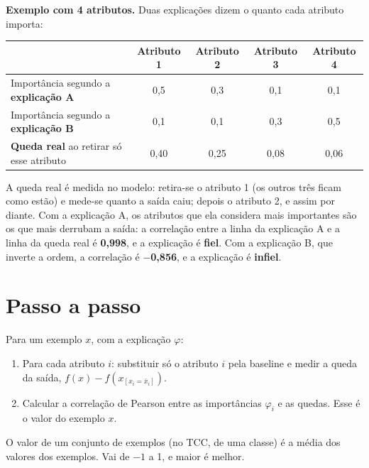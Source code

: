 \documentclass[11pt,a4paper]{article}
\begin{document}
\textbf{Exemplo com 4 atributos.} Duas explicações dizem o quanto cada atributo importa:

\begin{center}\small
\begin{tabular}{lcccc}
\toprule
& \textbf{Atributo 1} & \textbf{Atributo 2} & \textbf{Atributo 3} & \textbf{Atributo 4} \\
\midrule
Importância segundo a \textbf{explicação A} & 0,5 & 0,3 & 0,1 & 0,1 \\
Importância segundo a \textbf{explicação B} & 0,1 & 0,1 & 0,3 & 0,5 \\
\midrule
\textbf{Queda real} ao retirar só esse atributo & 0,40 & 0,25 & 0,08 & 0,06 \\
\bottomrule
\end{tabular}
\end{center}

A queda real é medida no modelo: retira-se o atributo 1 (os outros três ficam como estão) e mede-se quanto a saída caiu; depois o atributo 2, e assim por diante. Com a explicação A, os atributos que ela considera mais importantes são os que mais derrubam a saída: a correlação entre a linha da explicação A e a linha da queda real é \textbf{0,998}, e a explicação é \textbf{fiel}. Com a explicação B, que inverte a ordem, a correlação é \textbf{$-$0,856}, e a explicação é \textbf{infiel}.

\section{Passo a passo}
Para um exemplo $x$, com a explicação $\varphi$:
\begin{enumerate}
\item Para cada atributo $i$: substituir só o atributo $i$ pela baseline e medir a queda da saída, $f(x) - f(x_{[x_i = \bar{x}_i]})$.
\item Calcular a correlação de Pearson entre as importâncias $\varphi_i$ e as quedas. Esse é o valor do exemplo $x$.
\end{enumerate}
O valor de um conjunto de exemplos (no TCC, de uma classe) é a média dos valores dos exemplos. Vai de $-1$ a 1, e maior é melhor.
\end{document}
